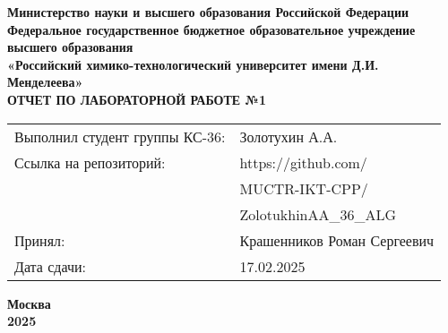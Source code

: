 \documentclass[12pt, a4paper]{report}
\begin{document}
	\begin{titlepage}
		\begin{center}
			\large \textbf{Министерство науки и высшего образования Российской Федерации} \\
			\large \textbf{Федеральное государственное бюджетное образовательное учреждение высшего образования} \\
			\large \textbf{«Российский химико-технологический университет имени Д.И. Менделеева»} \\

			\vspace*{4cm}
			\LARGE \textbf{ОТЧЕТ ПО ЛАБОРАТОРНОЙ РАБОТЕ №1}

			\vspace*{4cm}
			\begin{flushright}
				\Large
				\begin{tabular}{>{\raggedleft\arraybackslash}p{9cm} p{10cm}}
					Выполнил студент группы КС-36: & Золотухин А.А. \\
					Ссылка на репозиторий: & https://github.com/ \\ 
					& MUCTR-IKT-CPP/ \\
					& ZolotukhinAA\_36\_ALG \\
					Принял: & Крашенников Роман Сергеевич \\
					Дата сдачи: & 17.02.2025 \\
				\end{tabular}

			\end{flushright}

			\vspace*{6cm}
			\Large \textbf{Москва \\ 2025}
		\end{center}
	\end{titlepage}
	
	\tableofcontents	
	\thispagestyle{empty}
	\newpage

	
\end{document}
